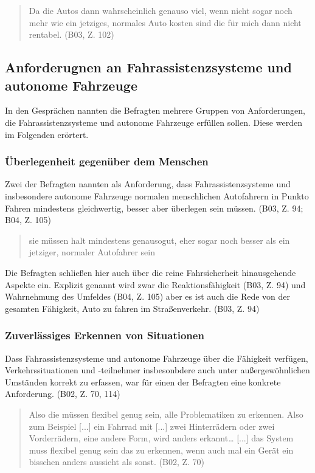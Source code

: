 \documentclass[12pt]{article}
\begin{document}
\begin{quote}
    Da die Autos dann wahrscheinlich genauso viel, wenn nicht sogar noch mehr wie ein jetziges, normales Auto kosten sind die für mich dann nicht rentabel. (B03, Z. 102)
\end{quote}

\subsection{Anforderugnen an Fahrassistenzsysteme und autonome Fahrzeuge}
In den Gesprächen nannten die Befragten mehrere Gruppen von Anforderungen, die Fahrassistenzsysteme und autonome Fahrzeuge erfüllen sollen. Diese werden im Folgenden erörtert.

\subsubsection*{Überlegenheit gegenüber dem Menschen}
Zwei der Befragten nannten als Anforderung, dass Fahrassistenzsysteme und insbesondere autonome Fahrzeuge normalen menschlichen Autofahrern in Punkto Fahren mindestens gleichwertig, besser aber überlegen sein müssen. (B03, Z. 94; B04, Z. 105)
\begin{quote}
    sie müssen halt mindestens genausogut, eher sogar noch besser als ein jetziger, normaler Autofahrer sein
\end{quote}

Die Befragten schließen hier auch über die reine Fahrsicherheit hinausgehende Aspekte ein. Explizit genannt wird zwar die Reaktionsfähigkeit (B03, Z. 94) und Wahrnehmung des Umfeldes (B04, Z. 105) aber es ist auch die Rede von \glqq der gesamten Fähigkeit, Auto zu fahren im Straßenverkehr\grqq{}. (B03, Z. 94)

\subsubsection*{Zuverlässiges Erkennen von Situationen}
Dass Fahrassistenzsysteme und autonome Fahrzeuge über die Fähigkeit verfügen, Verkehrssituationen und -teilnehmer insbesonbdere auch unter außergewöhnlichen Umständen korrekt zu erfassen, war für einen der Befragten eine konkrete Anforderung. (B02, Z. 70, 114)

\begin{quote}
    Also die müssen flexibel genug sein, alle Problematiken zu erkennen. Also zum Beispiel [...] ein Fahrrad mit [...] zwei Hinterrädern oder zwei Vorderrädern, eine andere Form, wird anders erkannt… [...] das System muss flexibel genug sein das zu erkennen, wenn auch mal ein Gerät ein bisschen anders aussieht als sonst. (B02, Z. 70)
\end{quote}
\end{document}
